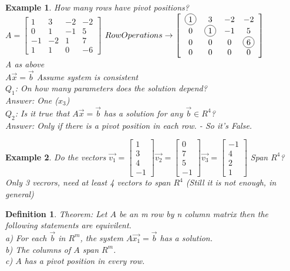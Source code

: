 \documentclass[a4paper,12pt,openany]{book}
\newcommand*\circled[1]{\tikz[baseline=(char.base)]{
            \node[shape=circle,draw,inner sep=2pt] (char) {#1};}}
\theoremstyle{defn}
\newtheorem{defn}{Definition}[section]
\theoremstyle{expl}
\newtheorem{expl}{Example}[section]
\begin{document}
\begin{expl}
\textup{
How many rows have pivot positions?\\
$A = \left[\begin{array}{cccc}1&3&-2&-2\\0&1&-1&5\\-1&-2&1&7\\1&1&0&-6\end{array}\right]$
$Row Operations \rightarrow \left[\begin{array}{cccc}\circled{1}&3&-2&-2\\0&\circled{1}&-1&5\\0&0&0&\circled{6}\\0&0&0&0\end{array}\right]$\\
A as above\\ $A\vec{x}=\vec{b}$ Assume system is consistent\\
$Q_1$: On how many parameters does the solution depend?\\
Answer: One ($x_3$)\\
$Q_2$: Is it true that $A\vec{x}=\vec{b}$ has a solution for any $\vec{b} \in R^4$?\\
Answer: Only if there is a pivot position in each row. - So it's False.
}\end{expl}
\begin{expl}\textup{
Do the vectors $\vec{v_1}=\left[\begin{array}{c}1\\3\\4\\-1\end{array}\right] \vec{v_2}=\left[\begin{array}{c}0\\7\\5\\-1\end{array}\right] \vec{v_3}=\left[\begin{array}{c}-1\\4\\2\\1\end{array}\right]$ Span $R^4$?\\
Only 3 vecrors, need at least 4 vectors to span $R^4$ (Still it is not enough, in general)
}\end{expl}
\begin{defn}\textup{Theorem: Let $A$ be an m row by n column matrix then the following statements are equivilent.\\
a) For each $\vec{b}$ in $R^m$, the system $A\vec{x_1}=\vec{b}$ has a solution.\\
b) The columns of $A$ span $R^m$.\\
c) $A$ has a pivot position in every row.}\end{defn}
\end{document}
